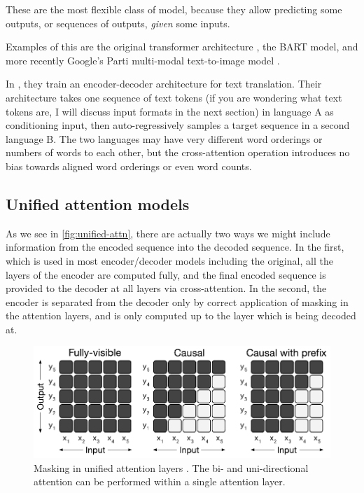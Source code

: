 These are the most flexible class of model, because they allow predicting some outputs, or sequences of outputs, \textit{given} some inputs.

Examples of this are the original transformer architecture \cite{attention-is-all-you-need}, the BART \cite{bart} model, and more recently Google's Parti multi-modal text-to-image model \cite{parti}.

In \cite{attention-is-all-you-need}, they train an encoder-decoder architecture for text translation. Their architecture takes one sequence of text tokens (if you are wondering what text tokens are, I will discuss input formats in the next section) in language A as conditioning input, then auto-regressively samples a target sequence in a second language B. The two languages may have very different word orderings or numbers of words to each other, but the cross-attention operation introduces no bias towards aligned word orderings or even word counts.

\subsection{Unified attention models}

As we see in \ref{fig:unified-attn}, there are actually two ways we might include information from the encoded sequence into the decoded sequence. In the first, which is used in most encoder/decoder models including the original, all the layers of the encoder are computed fully, and the final encoded sequence is provided to the decoder at all layers via cross-attention. In the second, the encoder is separated from the decoder only by correct application of masking in the attention layers, and is only computed up to the layer which is being decoded at.

\begin{figure}
    \includegraphics[width=\linewidth]{figures/attention_masks.pdf}
    \caption[Attention Masks]{Masking in unified attention layers \cite{unilm,t5}. The bi- and uni-directional attention can be performed within a single attention layer.}
    \label{fig:unified-masking}
\end{figure}

